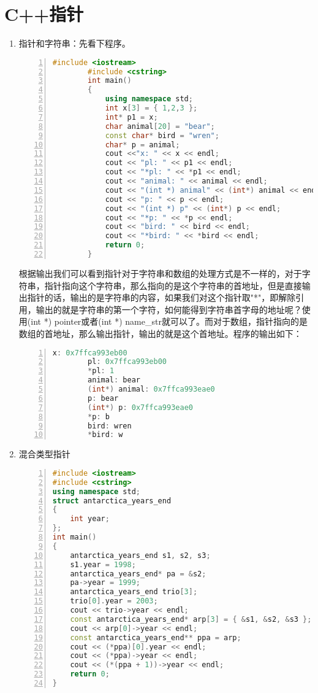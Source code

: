 \section{C++指针} %
\label{sec:c_指针}
\begin{enumerate}
	\item 指针和字符串：先看下程序。
	\begin{lstlisting}[language=C++, numbers=left, 
         numberstyle=\tiny,keywordstyle=\color{blue!70},
         commentstyle=\color{red!50!green!50!blue!50},frame=shadowbox,
         rulesepcolor=\color{red!20!green!20!blue!20},basicstyle=\ttfamily]
		#include <iostream>
		#include <cstring>
		int main()
		{
			using namespace std;
			int x[3] = { 1,2,3 };
			int* p1 = x;
			char animal[20] = "bear";
			const char* bird = "wren";
			char* p = animal;
			cout <<"x: " << x << endl;
			cout << "pl: " << p1 << endl;
			cout << "*pl: " << *p1 << endl;
			cout << "animal: " << animal << endl;
			cout << "(int *) animal" << (int*) animal << endl;	
			cout << "p: " << p << endl;
			cout << "(int *) p" << (int*) p << endl;
			cout << "*p: " << *p << endl;
			cout << "bird: " << bird << endl;
			cout << "*bird: " << *bird << endl;
			return 0;
		}
	\end{lstlisting}
	根据输出我们可以看到指针对于字符串和数组的处理方式是不一样的，对于字符串，指针指向这个字符串，那么指向的是这个字符串的首地址，但是直接输出指针的话，输出的是字符串的内容，如果我们对这个指针取"*"，即解除引用，输出的就是字符串的第一个字符，如何能得到字符串首字母的地址呢？使用(int *) pointer或者(int *) name\_str就可以了。而对于数组，指针指向的是数组的首地址，那么输出指针，输出的就是这个首地址。程序的输出如下：
	\begin{lstlisting}[language=C++, numbers=left, 
         numberstyle=\tiny,keywordstyle=\color{blue!70},
         commentstyle=\color{red!50!green!50!blue!50},frame=shadowbox,
         rulesepcolor=\color{red!20!green!20!blue!20},basicstyle=\ttfamily]
		x: 0x7ffca993eb00
		pl: 0x7ffca993eb00
		*pl: 1
		animal: bear
		(int*) animal: 0x7ffca993eae0
		p: bear
		(int*) p: 0x7ffca993eae0
		*p: b
		bird: wren
		*bird: w
	\end{lstlisting}
	\item 混合类型指针
\begin{lstlisting}[language=C++, numbers=left, 
         numberstyle=\tiny,keywordstyle=\color{blue!70},
         commentstyle=\color{red!50!green!50!blue!50},frame=shadowbox,
         rulesepcolor=\color{red!20!green!20!blue!20},basicstyle=\ttfamily]
#include <iostream>
#include <cstring>
using namespace std;
struct antarctica_years_end
{
	int year;
};
int main()
{
	antarctica_years_end s1, s2, s3;
	s1.year = 1998;
	antarctica_years_end* pa = &s2;
	pa->year = 1999;
	antarctica_years_end trio[3];
	trio[0].year = 2003;
	cout << trio->year << endl;
	const antarctica_years_end* arp[3] = { &s1, &s2, &s3 };
	cout << arp[0]->year << endl;
	const antarctica_years_end** ppa = arp;
	cout << (*ppa)[0].year << endl;
	cout << (*ppa)->year << endl;
	cout << (*(ppa + 1))->year << endl;
	return 0;
}
\end{lstlisting}	
\end{enumerate}

